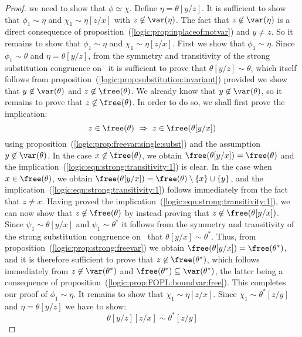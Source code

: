 \begin{proof}
we need to show that $\phi\simeq\chi$. Define $\eta=\theta[y/z]$. It
is sufficient to show that $\phi_{1}\sim\eta$ and
$\chi_{1}\sim\eta[z/x]$ with $z\not\in\var(\eta)$. The fact that
$z\not\in\var(\eta)$ is a direct consequence of
proposition~(\ref{logic:prop:inplaceof:notvar}) and $y\neq z$. So it
remains to show that $\phi_{1}\sim\eta$ and $\chi_{1}\sim\eta[z/x]$.
First we show that $\phi_{1}\sim\eta$. Since $\phi_{1}\sim\theta$
and $\eta=\theta[y/z]$, from the symmetry and transitivity of the
strong substitution congruence on \pv\, it is sufficient to prove
that $\theta[y/z]\sim\theta$, which itself follows from
proposition~(\ref{logic:prop:substitution:invariant}) provided we
show that $y\not\in\var(\theta)$ and $z\not\in\free(\theta)$. We
already know that $y\not\in\var(\theta)$, so it remains to prove
that $z\not\in\free(\theta)$. In order to do so, we shall first
prove the implication:
    \begin{equation}\label{logic:eqn:strong:transitivity:1}
    z\in\free(\theta)\ \Rightarrow\ z\in\free(\theta[y/x])
    \end{equation}
using proposition~(\ref{logic:prop:freevar:single:subst}) and the
assumption $y\not\in\var(\theta)$. In the case
$x\not\in\free(\theta)$, we obtain
$\free(\theta[y/x])=\free(\theta)$ and the
implication~(\ref{logic:eqn:strong:transitivity:1}) is clear. In the
case when $x\in\free(\theta)$, we obtain
$\free(\theta[y/x])=\free(\theta)\setminus\{x\}\cup\{y\}$, and the
implication~(\ref{logic:eqn:strong:transitivity:1}) follows
immediately from the fact that $z\neq x$. Having proved the
implication~(\ref{logic:eqn:strong:transitivity:1}), we can now show
that $z\not\in\free(\theta)$ by instead proving that
$z\not\in\free(\theta[y/x])$. Since $\psi_{1}\sim\theta[y/x]$ and
$\psi_{1}\sim\theta^{*}$ it follows from the symmetry and
transitivity of the strong substitution congruence on \pv\ that
$\theta[y/x]\sim\theta^{*}$. Thus, from
proposition~(\ref{logic:prop:strong:freevar}) we obtain
$\free(\theta[y/x])=\free(\theta^{*})$, and it is therefore
sufficient to prove that $z\not\in\free(\theta^{*})$, which follows
immediately from $z\not\in\var(\theta^{*})$ and
$\free(\theta^{*})\subseteq\var(\theta^{*})$, the latter being a
consequence of proposition~(\ref{logic:prop:FOPL:boundvar:free}).
This completes our proof of $\phi_{1}\sim\eta$. It remains to show
that $\chi_{1}\sim\eta[z/x]$. Since $\chi_{1}\sim\theta^{*}[z/y]$
and $\eta=\theta[y/z]$ we have to show:
    \begin{equation}\label{logic:eqn:strong:transitivity:2}
    \theta[y/z][z/x]\sim\theta^{*}[z/y]

\end{equation}
\end{proof}
